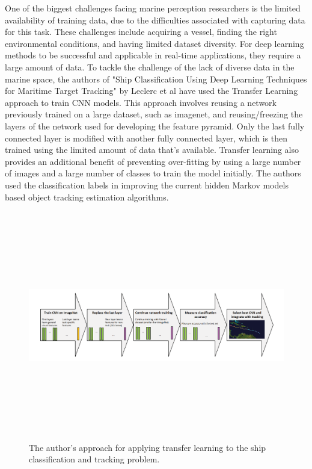 One of the biggest challenges facing marine perception researchers is the limited availability of training data, due to the difficulties associated with capturing data for this task. These challenges include acquiring a vessel, finding the right environmental conditions, and having limited dataset diversity. For deep learning methods to be successful and applicable in real-time applications, they require a large amount of data. To tackle the challenge of the lack of diverse data in the marine space, the authors of "Ship Classification Using Deep Learning Techniques for Maritime Target Tracking" by Leclerc et al\cite{leclerc2018ship} have used the Transfer Learning approach to train CNN models. This approach involves reusing a network previously trained on a large dataset, such as imagenet, and reusing/freezing the layers of the network used for developing the feature pyramid. Only the last fully connected layer is modified with another fully connected layer, which is then trained using the limited amount of data that's available. Transfer learning also provides an additional benefit of preventing over-fitting by using a large number of images and a large number of classes to train the model initially. The authors used the classification labels in improving the current hidden Markov models based object tracking estimation algorithms. 
\begin{figure}[H]
    \centering
    \includegraphics[width=\textwidth,height=10cm,keepaspectratio=true]{src/Images/leclerc_approach.PNG}
    \caption{The author's approach for applying transfer learning to the ship classification and tracking problem.\cite{leclerc2018ship}
     }
\end{figure}
\\

